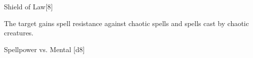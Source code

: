 \begin{spellsection}{Shield of Law}[8]
    \begin{spellheader}
    \end{spellheader}
    \begin{spellcontent}
        \begin{spelltargetinginfo}
        \end{spelltargetinginfo}
        \begin{spelleffects}
            \spelleffect The target gains spell resistance against chaotic spells and spells cast by chaotic creatures.
            \spelldur \durshort \dismissable
        \end{spelleffects}
    \end{spellcontent}
    \begin{spellsubcontent}
        \begin{spelltargetinginfo}
        \end{spelltargetinginfo}
        \begin{spelleffects}
            \begin{spellattack}{Spellpower vs. Mental}
                \spellsuccess {}[d8]
            \end{spellattack}
        \end{spelleffects}
    \end{spellsubcontent}
    \begin{spellfooter}
        \miscastexplode
    \end{spellfooter}
\end{spellsection}

